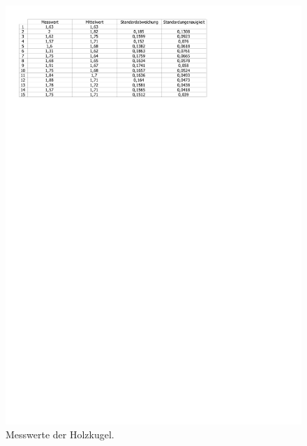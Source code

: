 \documentclass[11pt,a4paper,titlepage, ngerman]{article}
\begin{document}
		\begin{figure}
			\includegraphics[scale=0.68]{Metallkugel.pdf}
			\caption{Messwerte der Holzkugel.}
		\end{figure}
\end{document}
